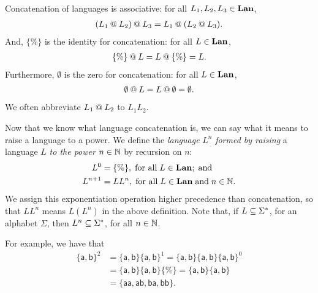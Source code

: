 Concatenation of languages is associative: for all $L_1,L_2,L_3\in\mathbf{Lan}$,
%
%
%
\begin{gather*}
(L_1\mathbin{@} L_2)\mathbin{@} L_3 = L_1\mathbin{@}(L_2\mathbin{@} L_3) .
\end{gather*}
And, $\{\%\}$ is the identity for concatenation:
%
%
%
for all $L\in\mathbf{Lan}$,
\begin{gather*}
{\{\%\}}\mathbin{@} L=L\mathbin{@}{\{\%\}}=L.
\end{gather*}
Furthermore, $\emptyset$ is the zero for concatenation:
%
%
%
for all $L\in\mathbf{Lan}$,
\begin{gather*}
\emptyset\mathbin{@} L=L\mathbin{@}\emptyset={\emptyset} .
\end{gather*}
We often abbreviate $L_1\mathbin{@} L_2$ to $L_1L_2$.

Now that we know what language concatenation is, we can say what it
means to raise a language to a power.  We define the \emph{language}
%
%
%
%
$L^n$ \emph{formed by raising} a language $L$ \emph{to the
  power} $n\in\mathbb{N}$
%
%
by recursion on $n$:
\begin{align*}
L^0      &= {\{\%\}} , \;\allowbreak\mbox{for all}\allowbreak\;L\in\mathbf{Lan} ; \;\allowbreak\mbox{and}\allowbreak\; \\
L^{n + 1} &= LL^n ,\;\allowbreak\mbox{for all}\allowbreak\;L\in\mathbf{Lan}\;\allowbreak\mbox{and}\allowbreak\;n\in\mathbb{N} .
\end{align*}
We assign this exponentiation operation higher precedence than
concatenation, so that $LL^n$ means $L(L^n)$ in the above definition.
Note that, if $L\subseteq\Sigma^*$, for an alphabet $\Sigma$, then
$L^n\subseteq\Sigma^*$, for all $n\in\mathbb{N}$.

For example, we have that
\begin{align*}
\mathsf{\{a,b\}}^2 &= 
\mathsf{\{a,b\}}\mathsf{\{a,b\}}^1 =
\mathsf{\{a,b\}}\mathsf{\{a,b\}}\mathsf{\{a,b\}}^0 \\
&=\mathsf{\{a,b\}}\mathsf{\{a,b\}}\{\%\} =
\mathsf{\{a,b\}}\mathsf{\{a,b\}} \\
&=\mathsf{\{aa, ab, ba, bb\}}.
\end{align*}

